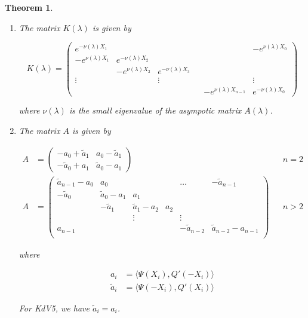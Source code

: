 \documentclass[12pt]{article}
\newtheorem{theorem}{Theorem}
\begin{document}
\begin{theorem}
\begin{enumerate}
\item The matrix $K(\lambda)$ is given by

\begin{equation}
K(\lambda) = 
\begin{pmatrix}
e^{-\nu(\lambda)X_1} & & & & & -e^{\nu(\lambda)X_0} \\
-e^{\nu(\lambda)X_1} & e^{-\nu(\lambda)X_2} \\
& -e^{\nu(\lambda)X_2} & e^{-\nu(\lambda)X_3} \\
\vdots & & \vdots & &&  \vdots \\
& & & & -e^{\nu(\lambda)X_{n-1}} & e^{-\nu(\lambda)X_0} 
\end{pmatrix}
\end{equation}

where $\nu(\lambda)$ is the small eigenvalue of the asympotic matrix $A(\lambda)$.

\item The matrix $A$ is given by

\begin{align*}
A &= \begin{pmatrix}
-a_0 + \tilde{a}_1 & a_0 - \tilde{a}_1 \\
-\tilde{a}_0 + a_1 & \tilde{a}_0 - a_1
\end{pmatrix} && n = 2 \\
A &= \begin{pmatrix}
\tilde{a}_{n-1} - a_0 & a_0 & & & \dots & -\tilde{a}_{n-1}\\
-\tilde{a}_0 & \tilde{a}_0 - a_1 &  a_1 \\
& -\tilde{a}_1 & \tilde{a}_1 - a_2 &  a_2 \\
& & \vdots & & \vdots \\
a_{n-1} & & & & -\tilde{a}_{n-2} & \tilde{a}_{n-2} - a_{n-1} \\
\end{pmatrix} && n > 2
\end{align*}

where

\begin{align*}
a_i &= \langle \Psi(X_i), Q'(-X_i) \rangle \\
\tilde{a}_i &= \langle \Psi(-X_i), Q'(X_i) \rangle
\end{align*}

For KdV5, we have $\tilde{a}_i = a_i$.

\end{enumerate}



\end{theorem}
\end{document}
